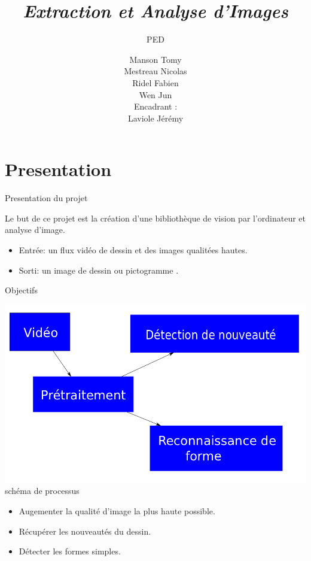 \documentclass[t,14pt]{beamer}
\title{\textbf{\textit{Extraction et Analyse d'Images}}}
\subtitle{PED}
\author{\scriptsize{Manson Tomy\\
		Mestreau Nicolas\\
		Ridel Fabien\\
		Wen Jun\\
		\vspace{10mm}
		Encadrant : \\
		Laviole Jérémy\\
		}}
\institute{\tiny Université de Bordeaux 1}
\begin{document}
\frame{\titlepage}

\section[Presentation]{Presentation}

\begin{frame}{Presentation du projet}
\begin{center}
\vspace{5mm}
Le but de ce projet est la création d'une bibliothèque de vision par l'ordinateur et analyse d'image.

\end{center}
\begin{itemize}
\item Entrée: un flux vidéo de dessin et des images qualitées hautes.
\item Sorti: un image de dessin ou pictogramme .
\end{itemize}
\end{frame}

\begin{frame}{Objectifs}
\begin{center}
\includegraphics[scale=0.2]{images/dessin.png} 
\\ schéma de processus
\end{center}
\begin{itemize}
\item Augementer la qualité d'image la plus haute possible.
\item Récupérer les nouveautés du dessin.
\item Détecter les formes simples. 
\end{itemize}
\end{frame}
\end{document}
